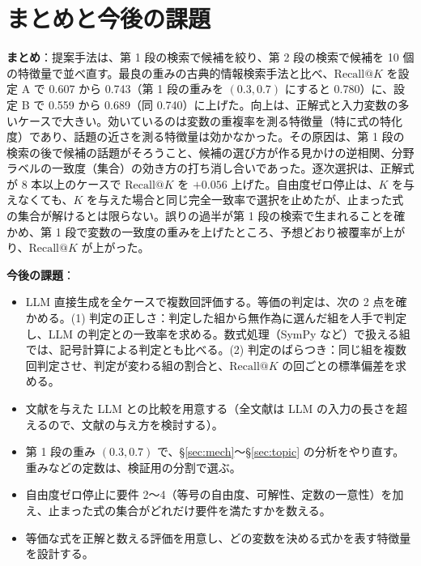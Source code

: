 \documentclass[a4j,dvipdfmx,11pt]{jresume}
\makeatletter
\newcommand{\rk}{\textrm{Recall@}K}
\makeatother
\begin{document}
\section{まとめと今後の課題}\label{sec:summary}
\textbf{まとめ}：提案手法は、第 1 段の検索で候補を絞り、第 2 段の検索で候補を 10 個の特徴量で並べ直す。最良の重みの古典的情報検索手法と比べ、$\rk$ を設定 A で 0.607 から 0.743（第 1 段の重みを $(0.3, 0.7)$ にすると 0.780）に、設定 B で 0.559 から 0.689（同 0.740）に上げた。向上は、正解式と入力変数の多いケースで大きい。効いているのは変数の重複率を測る特徴量（特に式の特化度）であり、話題の近さを測る特徴量は効かなかった。その原因は、第 1 段の検索の後で候補の話題がそろうこと、候補の選び方が作る見かけの逆相関、分野ラベルの一致度（集合）の効き方の打ち消し合いであった。逐次選択は、正解式が 8 本以上のケースで $\rk$ を $+0.056$ 上げた。自由度ゼロ停止は、$K$ を与えなくても、$K$ を与えた場合と同じ完全一致率で選択を止めたが、止まった式の集合が解けるとは限らない。誤りの過半が第 1 段の検索で生まれることを確かめ、第 1 段で変数の一致度の重みを上げたところ、予想どおり被覆率が上がり、$\rk$ が上がった。

\textbf{今後の課題}：
\begin{itemize}[leftmargin=1.5em]
  \item LLM 直接生成を全ケースで複数回評価する。等価の判定は、次の 2 点を確かめる。(1) 判定の正しさ：判定した組から無作為に選んだ組を人手で判定し、LLM の判定との一致率を求める。数式処理（SymPy など）で扱える組では、記号計算による判定とも比べる。(2) 判定のばらつき：同じ組を複数回判定させ、判定が変わる組の割合と、$\rk$ の回ごとの標準偏差を求める。
  \item 文献を与えた LLM との比較を用意する（全文献は LLM の入力の長さを超えるので、文献の与え方を検討する）。
  \item 第 1 段の重み $(0.3, 0.7)$ で、\S\ref{sec:mech}〜\S\ref{sec:topic} の分析をやり直す。重みなどの定数は、検証用の分割で選ぶ。
  \item 自由度ゼロ停止に要件 2〜4（等号の自由度、可解性、定数の一意性）を加え、止まった式の集合がどれだけ要件を満たすかを数える。
  \item 等価な式を正解と数える評価を用意し、どの変数を決める式かを表す特徴量を設計する。
\end{itemize}
\end{document}
